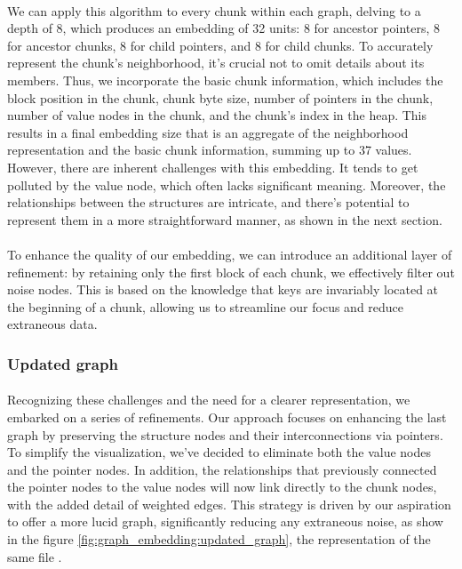         \paragraph{}We can apply this algorithm to every \gls{chunk} within each graph, delving to a depth of 8, which produces an embedding of 32 units: 8 for ancestor \glspl{pointer}, 8 for ancestor \glspl{chunk}, 8 for child \glspl{pointer}, and 8 for child \glspl{chunk}. To accurately represent the \gls{chunk}'s neighborhood, it's crucial not to omit details about its members. Thus, we incorporate the basic chunk information, which includes the block position in the chunk, chunk byte size, number of pointers in the chunk, number of value nodes in the chunk, and the chunk's index in the heap. This results in a final embedding size that is an aggregate of the neighborhood representation and the basic chunk information, summing up to 37 values. However, there are inherent challenges with this embedding. It tends to get polluted by the value node, which often lacks significant meaning. Moreover, the relationships between the structures are intricate, and there's potential to represent them in a more straightforward manner, as shown in the next section.

        \paragraph{}\label{sec:embedding:first_graph_only_first_block}To enhance the quality of our embedding, we can introduce an additional layer of refinement: by retaining only the first block of each chunk, we effectively filter out noise nodes. This is based on the knowledge that keys are invariably located at the beginning of a chunk, allowing us to streamline our focus and reduce extraneous data.

    \subsubsection{Updated graph}\label{sec:embedding:updated_graph}

        \paragraph{}Recognizing these challenges and the need for a clearer representation, we embarked on a series of refinements. Our approach focuses on enhancing the last graph by preserving the structure nodes and their interconnections via \glspl{pointer}. To simplify the visualization, we've decided to eliminate both the value nodes and the \gls{pointer} nodes. In addition, the relationships that previously connected the \gls{pointer} nodes to the value nodes will now link directly to the \gls{chunk} nodes, with the added detail of weighted edges. This strategy is driven by our aspiration to offer a more lucid graph, significantly reducing any extraneous noise, as show in the figure \ref{fig:graph_embedding:updated_graph}, the representation of the same file .

